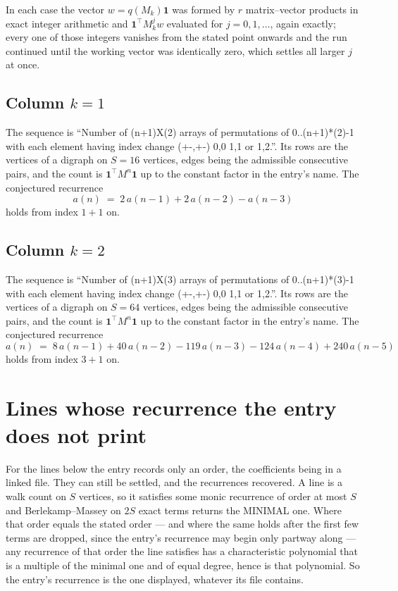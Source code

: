 \documentclass[11pt,a4paper]{article}
\theoremstyle{plain}
\theoremstyle{definition}
\begin{document}
In each case the vector $w=q(M_k)\mathbf{1}$ was formed by $r$ matrix--vector products in
exact integer arithmetic and $\mathbf{1}^{\!\top}M_k^{j}w$ evaluated for $j=0,1,\dots$,
again exactly; every one of those integers vanishes from the stated point onwards and the run
continued until the working vector was identically zero, which settles all larger $j$ at once.

\subsection*{Column $k$$=1$}
The sequence is ``Number of (n+1)X(2) arrays of permutations of 0..(n+1)*(2)-1 with each element having index change (+-,+-) 0,0 1,1 or 1,2.''. Its rows are the vertices of a digraph on
$S=16$ vertices, edges being the admissible consecutive pairs, and the count is
$\mathbf{1}^{\!\top}M^{n}\mathbf{1}$ up to the constant factor in the entry's name.
The conjectured recurrence
\[
a(n)\;=\;2\,a(n-1) + 2\,a(n-2) - a(n-3)
\]
holds from index $1+1$ on.

\subsection*{Column $k$$=2$}
The sequence is ``Number of (n+1)X(3) arrays of permutations of 0..(n+1)*(3)-1 with each element having index change (+-,+-) 0,0 1,1 or 1,2.''. Its rows are the vertices of a digraph on
$S=64$ vertices, edges being the admissible consecutive pairs, and the count is
$\mathbf{1}^{\!\top}M^{n}\mathbf{1}$ up to the constant factor in the entry's name.
The conjectured recurrence
\[
a(n)\;=\;8\,a(n-1) + 40\,a(n-2) - 119\,a(n-3) - 124\,a(n-4) + 240\,a(n-5)
\]
holds from index $3+1$ on.


\section{Lines whose recurrence the entry does not print}

For the lines below the entry records only an order, the coefficients being in a linked file.
They can still be settled, and the recurrences recovered. A line is a walk count on $S$
vertices, so it satisfies some monic recurrence of order at most $S$ and Berlekamp--Massey on
$2S$ exact terms returns the MINIMAL one. Where that order equals the stated order --- and
where the same holds after the first few terms are dropped, since the entry's recurrence may
begin only partway along --- any recurrence of that order the line satisfies has a
characteristic polynomial that is a multiple of the minimal one and of equal degree, hence is
that polynomial. So the entry's recurrence is the one displayed, whatever its file contains.
\end{document}
